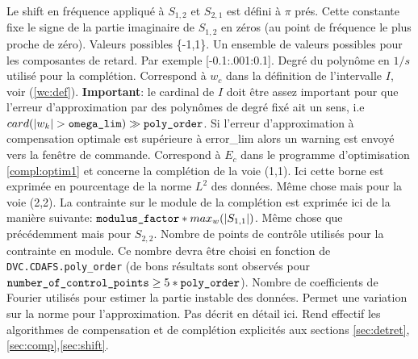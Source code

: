{ Le shift en fr\'equence
appliqu\'e \`a $S_{1,2}$ et $S_{2,1}$ est d\'efini \`a $\pi$
pr\'es. Cette constante fixe le 
signe de la partie imaginaire de $S_{1,2}$ en z\'eros (au point de
fr\'equence le plus proche de z\'ero). Valeurs possibles \{-1,1\}.
 Un ensemble de valeurs possibles pour les
composantes de retard. Par exemple [-0.1:.001:0.1]. 
 Degr\'e du polyn\^ome en $1/s$
utilis\'e pour la compl\'etion.
 Correspond \`a $w_c$ dans la d\'efinition de
l'intervalle $I$, voir (\ref{wc:def}). {\bf Important}: le cardinal de $I$ doit \^etre assez important pour que l'erreur d'approximation
par des polyn\^omes de degr\'e fix\'e ait un sens, i.e
$card(|w_k|>\mbox{\texttt{omega\_lim}}) \gg \mbox{\texttt{poly\_order}}$.
 Si l'erreur d'approximation \`a
compensation optimale est sup\'erieure \`a error\_lim alors un warning
est envoy\'e vers la fen\^etre de commande.
 Correspond \`a $E_c$ dans le
programme d'optimisation \ref{compl:optim1} et concerne la compl\'etion de 
la voie (1,1). Ici cette borne est exprim\'ee en pourcentage de la norme $L^2$ des donn\'ees. 
 M\^eme chose mais pour la voie (2,2).
 La contrainte sur le module de la 
compl\'etion est exprim\'ee ici de la mani\`ere suivante: $\mbox{\texttt{modulus\_factor}} * max_{w}(|S_{1,1}|)$.
 M\^eme chose que pr\'ec\'edemment
mais pour $S_{2,2}$.
 Nombre de points de
contr\^ole utilis\'es pour la contrainte en module. Ce nombre devra \^etre
choisi en fonction de \texttt{DVC.CDAFS.poly\_order} (de bons r\'esultats sont
observ\'es pour $\mbox{\texttt{number\_of\_control\_points}} \geq 5*\mbox{\texttt{poly\_order}}$).
 Nombre de coefficients de Fourier
utilis\'es pour estimer la partie instable des donn\'ees.
 Permet une variation sur la norme pour
l'approximation. Pas d\'ecrit en d\'etail ici.}
{}
Rend effectif les algorithmes de compensation et de compl\'etion explicit\'es aux sections \ref{sec:detret},\ref{sec:comp},\ref{sec:shift}.


     

